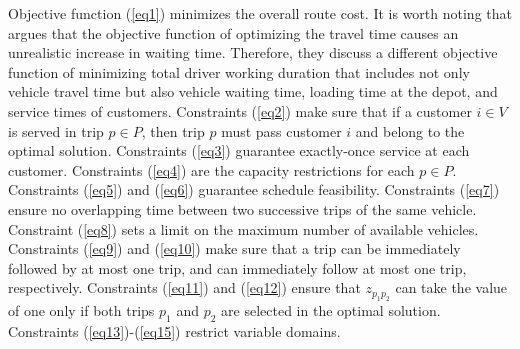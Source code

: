 \documentclass[11pt]{article}
\begin{document}
Objective function (\ref{eq1}) minimizes the overall route cost.  It is worth noting that \cite{franccois2019adaptive} argues that the objective function of optimizing the travel time causes an unrealistic increase in waiting time.  Therefore, they discuss a different objective function of minimizing total driver working duration that includes not only vehicle travel time but also vehicle waiting time, loading time at the depot, and service times of customers.  Constraints (\ref{eq2}) make sure that if a customer $i \in V$ is served in trip $p \in P$, then trip $p$ must pass customer $i$ and belong to the optimal solution. Constraints (\ref{eq3}) guarantee exactly-once service at each customer.  Constraints (\ref{eq4}) are the capacity restrictions for each $p \in P$.  Constraints (\ref{eq5}) and (\ref{eq6}) guarantee schedule feasibility.  Constraints (\ref{eq7}) ensure no overlapping time between two successive trips of the same vehicle.  Constraint (\ref{eq8}) sets a limit on the maximum number of available vehicles.  Constraints (\ref{eq9}) and (\ref{eq10}) make sure that a trip can be immediately followed by at most one trip, and can immediately follow at most one trip, respectively.  Constraints (\ref{eq11}) and (\ref{eq12}) ensure that $z_{{p_1}{p_2}}$ can take the value of one only if both trips $p_1$ and $p_2$ are selected in the optimal solution.  Constraints (\ref{eq13})-(\ref{eq15}) restrict variable domains.
\newline



\end{document}
